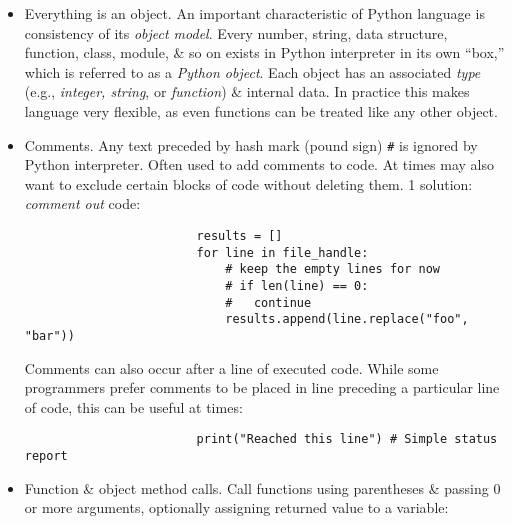 \documentclass{article}
\newtheorem{remark}{Remark}
\begin{document}
\begin{enumerate}
\begin{itemize}
\begin{itemize}
\begin{itemize}
\begin{itemize}
					\begin{remark}
						Strong recommend using \emph{4 spaces} as your default indentation \& replacing tabs with 4 spaces. Many text editors have a setting that will replace tab stops with spaces automatically insert 4 spaces on new lines following a colon \& replace tabs by 4 spaces.
					\end{remark}
					As you can see by now, Python statements also do not need to be terminated by semicolons. Semicolons can be used, however, to separate multiple statements on a single line:
					\begin{verbatim}
						a = 5; b = 6; c = 7
					\end{verbatim}
					Putting multiple statements on 1 line is generally discouraged in Python as it can make code less readable.
					\item {\sf Everything is an object.} An important characteristic of Python language is consistency of its {\it object model}. Every number, string, data structure, function, class, module, \& so on exists in Python interpreter in its own ``box,'' which is referred to as a {\it Python object}. Each object has an associated {\it type} (e.g., {\it integer, string}, or {\it function}) \& internal data. In practice this makes language very flexible, as even functions can be treated like any other object.
					\item {\sf Comments.} Any text preceded by hash mark (pound sign) \verb|#| is ignored by Python interpreter. Often used to add comments to code. At times may also want to exclude certain blocks of code without deleting them. 1 solution: {\it comment out} code:
					\begin{verbatim}
						results = []
						for line in file_handle:
						    # keep the empty lines for now
						    # if len(line) == 0:
						    #   continue
						    results.append(line.replace("foo", "bar"))
					\end{verbatim}
					Comments can also occur after a line of executed code. While some programmers prefer comments to be placed in line preceding a particular line of code, this can be useful at times:
					\begin{verbatim}
						print("Reached this line") # Simple status report
					\end{verbatim}
					\item {\sf Function \& object method calls.} Call functions using parentheses \& passing 0 or more arguments, optionally assigning returned value to a variable:
					\begin{verbatim}

\end{verbatim}
\end{itemize}
\end{itemize}
\end{itemize}
\end{itemize}
\end{enumerate}
\end{document}
